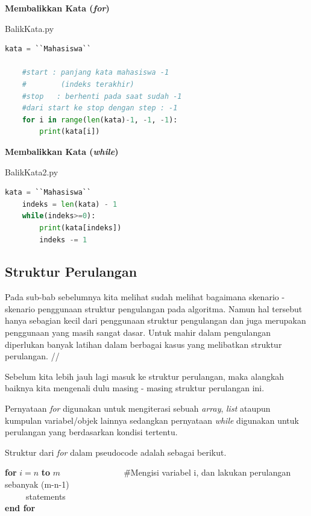 \begin{enumerate}
\begin{contoh}
	\textbf{Membalikkan Kata (\textit{for})}
\begin{listprog}{BalikKata.py}
\label{lst:BalikKata}
\begin{lstlisting}[language=Python]
	kata = ``Mahasiswa``
	
	#start : panjang kata mahasiswa -1 
	#        (indeks terakhir)
	#stop	: berhenti pada saat sudah -1
	#dari start ke stop dengan step : -1
	for i in range(len(kata)-1, -1, -1):
		print(kata[i])
\end{lstlisting}
\end{listprog}
\end{contoh}

\begin{contoh}
	\textbf{Membalikkan Kata (\textit{while})}
\begin{listprog}{BalikKata2.py}
\label{lst:BalikKata2}
\begin{lstlisting}[language=Python]
	kata = ``Mahasiswa``
	indeks = len(kata) - 1
	while(indeks>=0):
		print(kata[indeks])
		indeks -= 1
	\end{lstlisting}
\end{listprog}
\end{contoh}
\end{enumerate}

\subsection{Struktur Perulangan}
Pada sub-bab sebelumnya kita melihat sudah melihat bagaimana skenario - skenario penggunaan struktur pengulangan pada algoritma. Namun hal tersebut hanya sebagian kecil dari penggunaan struktur pengulangan dan juga merupakan penggunaan yang masih sangat dasar. Untuk mahir dalam pengulangan diperlukan banyak latihan dalam berbagai kasus yang melibatkan struktur perulangan. //

Sebelum kita lebih jauh lagi masuk ke struktur perulangan, maka alangkah baiknya kita mengenali dulu masing - masing struktur perulangan ini. 

Pernyataan \textit{for} digunakan untuk mengiterasi sebuah \textit{array}, \textit{list} ataupun kumpulan variabel/objek lainnya sedangkan pernyataan \textit{while} digunakan untuk perulangan yang berdasarkan kondisi tertentu.

Struktur dari \textit{for} dalam pseudocode adalah sebagai berikut.
\begin{tabbing}
\textbf{for} $i=n$ \textbf{to} $m$~~~~~~~~~~~~~~~\=\#Mengisi variabel i, dan lakukan perulangan sebanyak (m-n-1)\\
~~~~~statements\\
\textbf{end for}
\end{tabbing}

